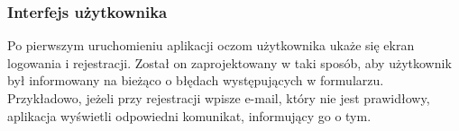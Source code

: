 \documentclass[twoside]{projektInzynierskiMS}
\numberwithin{figure}{section}
\begin{document}
\subsubsection{Interfejs użytkownika}

Po pierwszym uruchomieniu aplikacji oczom użytkownika ukaże się ekran logowania i rejestracji. Został on zaprojektowany w taki sposób, aby użytkownik był informowany na bieżąco o błędach występujących w formularzu. Przykładowo, jeżeli przy rejestracji wpisze e-mail, który nie jest prawidłowy, aplikacja wyświetli odpowiedni komunikat, informujący go o tym.

\begin{figure}[h!]
\end{figure}
\end{document}
